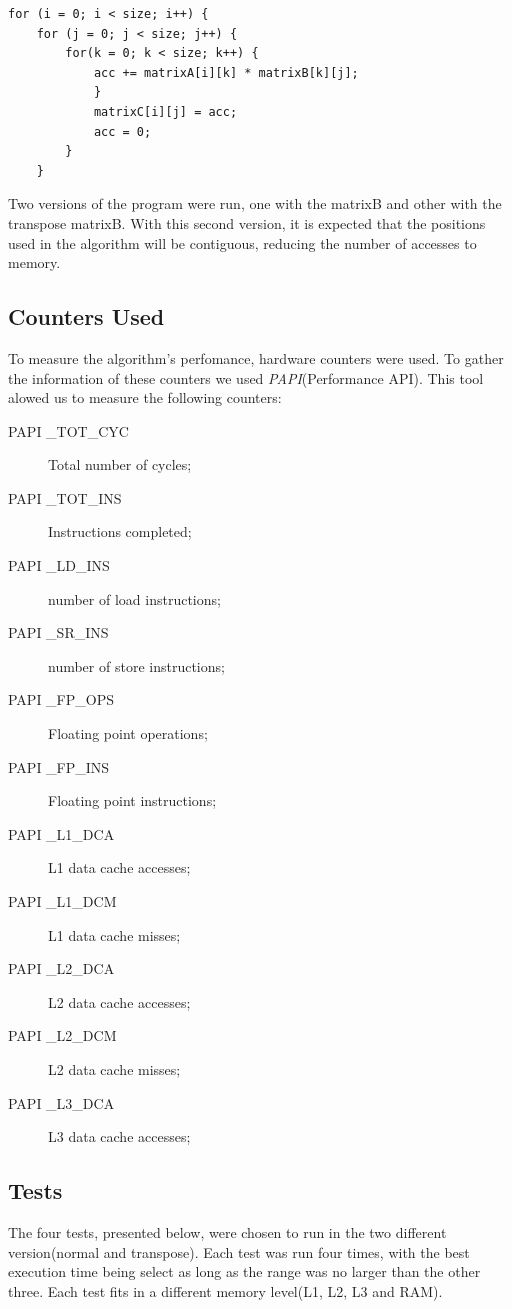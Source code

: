\documentclass[a4paper,10pt,openright,openbib]{article}
\begin{document}
\begin{verbatim}
for (i = 0; i < size; i++) {
    for (j = 0; j < size; j++) {
        for(k = 0; k < size; k++) {
            acc += matrixA[i][k] * matrixB[k][j];				
            }		
            matrixC[i][j] = acc;	
            acc = 0;
        }
    }
\end{verbatim}

Two versions of the program were run, one with the matrixB and other with the transpose matrixB. With this second version, it is expected that the positions used in the algorithm will be contiguous, reducing the number of accesses to memory. 

\subsection{Counters Used}
To measure the algorithm's perfomance, hardware counters were used. To gather the information of these counters we used \emph{PAPI}(Performance API). This tool alowed us to measure the following counters:
\begin{description}
\item[PAPI \_TOT\_CYC] Total number of cycles;
\item[PAPI \_TOT\_INS] Instructions completed;
\item[PAPI \_LD\_INS] number of load instructions;
\item[PAPI \_SR\_INS] number of store instructions;
\item[PAPI \_FP\_OPS] Floating point operations;
\item[PAPI \_FP\_INS] Floating point instructions;
\item[PAPI \_L1\_DCA] L1 data cache accesses;
\item[PAPI \_L1\_DCM] L1 data cache misses;
\item[PAPI \_L2\_DCA] L2 data cache accesses;
\item[PAPI \_L2\_DCM] L2 data cache misses;
\item[PAPI \_L3\_DCA] L3 data cache accesses;
\end{description}

\subsection{Tests}
The four tests, presented below, were chosen to run in the two different version(normal and transpose). Each test was run four times, with the best execution time being select as long as the range was no larger than the other three. Each test fits in a different memory level(L1, L2, L3 and RAM).   
\begin{table}[!htp]
\end{table}
\end{document}
